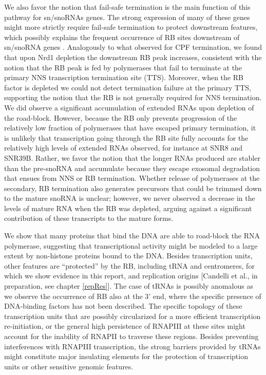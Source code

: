 We also favor the notion that fail-safe termination is the main function of this pathway for sn/snoRNAs genes. The strong expression of many of these genes might more strictly require fail-safe termination to protect downstream features, which possibly explains the frequent occurrence of RB sites downstream of sn/snoRNA genes \cite{roy:2016:common}. Analogously to what observed for CPF termination, we found that upon Nrd1 depletion the downstream RB peak increases, consistent with the notion that the RB peak is fed by polymerases that fail to terminate at the primary NNS  transcription termination site (TTS). Moreover, when the RB factor is depleted we could not detect termination failure at the primary TTS, supporting the notion that the RB is not generally required for NNS termination. We did observe a significant accumulation of extended RNAs upon depletion of the road-block. However, because the RB only prevents progression of the relatively low fraction of polymerases that have escaped primary termination, it is unlikely that transcription going through the RB site fully accounts for the relatively high levels of extended RNAs observed, for instance at SNR8 and SNR39B. Rather, we favor the notion that the longer RNAs produced are stabler than the pre-snoRNA and accumulate because they escape exosomal degradation that ensues from NNS or RB termination. Whether release of polymerases at the secondary, RB termination also generates precursors that could be trimmed down to the mature snoRNA is unclear; however, we never observed a decrease in the levels of mature RNA when the RB was depleted, arguing against a significant contribution of these transcripts to the mature forms. 

We show that many proteins that bind the DNA are able to road-block the RNA polymerase, suggesting that transcriptional activity might be modeled to a large extent by non-histone proteins bound to the DNA. Besides transcription units, other features are “protected” by the RB, including tRNA and centromeres, for which we show evidence in this report, and replication origins [Candelli et al., in preparation, see chapter \ref{repRes}]. The case of tRNAs is possibly anomalous as we observe the occurrence of RB also at the 3’ end, where the specific presence of DNA-binding factors has not been described. The specific topology of these transcription units that are possibly circularized for a more efficient transcription re-initiation, or the general high persistence of RNAPIII at these sites might account for the inability of RNAPII to traverse these regions. Besides preventing interferences with RNAPIII transcription, the strong barriers provided by tRNAs might constitute major insulating elements for the protection of transcription units or other sensitive genomic features. 

